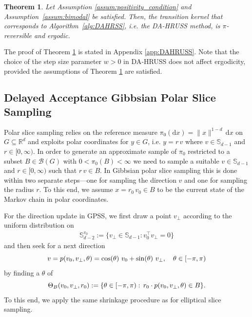 \documentclass[sn-mathphys-num]{sn-jnl}%
\theoremstyle{thmstyleone}%
\newtheorem{theorem}{Theorem}%
\theoremstyle{thmstyletwo}%
\theoremstyle{thmstylethree}%
\newcommand{\rhoapp}{\varrho_{{\rm app}}}
\newcommand{\change}[1]{\bgroup\color{black}#1\egroup}    %
\begin{document}
\begin{theorem}\label{theo:DAHRUSS}
\change{Let Assumption \ref{assum:positivity_condition} and Assumption~\ref{assum:bimodal} be satisfied.} Then, the transition kernel that corresponds to Algorithm~\ref{alg:DAHRSS}, i.e. the DA-HRUSS method, is $\pi$-reversible and ergodic.
\end{theorem}
The proof of Theorem \ref{theo:DAHRUSS} is stated in Appendix \ref{app:DAHRUSS}. 
Note that the choice of the step size parameter $w>0$ in DA‑HRUSS does not affect ergodicity, provided the assumptions of Theorem \ref{theo:DAHRUSS} are satisfied. 

\subsection{Delayed Acceptance Gibbsian Polar Slice Sampling}\label{sec:DA-GPSS}

Polar slice sampling relies on the reference measure $\pi_0(\mathrm dx) = \|x\|^{1-d} \, \mathrm dx$ on $G \subseteq \mathbb R^d$ and exploits polar coordinates for $y\in G$, i.e. $y = r\,v$ where $v \in \mathbb{S}_{d-1}$ and $r \in [0, \infty)$. %
In order to generate an approximate sample of $\pi_0$ restricted to a subset $B\in\mathcal B(G)$ with $0 < \pi_0(B) < \infty$ we need to sample a suitable $v \in \mathbb{S}_{d-1}$ and $r \in [0, \infty)$ such that $r\,v \in B$.
In Gibbsian polar slice sampling this is done within two separate steps---one for sampling the direction $v$ and one for sampling the radius $r$. 
To this end, we assume $x = r_0\,v_0 \in B$ to be the current state of the Markov chain in polar coordinates.  

For the direction update in GPSS, we first draw a point $v_{\perp}$ according to the uniform distribution on 
\begin{align*}
   \mathbb{S}^{v_0}_{d-2}:=\{v_{\perp} \in\mathbb{S}_{d-1}: v_0^\top v_{\perp} = 0 \}
\end{align*}
and then seek for a next direction
\[
    v 
    = p(v_0, v_\perp, \theta)
    = \cos(\theta) \ v_0 + \sin(\theta)\ v_\perp, \quad \change{\theta\in[-\pi,\pi)}
\]
by finding a $\theta$ of
\[
   \Theta_B(v_0,v_\perp,r_0):=\{\theta\in\change{[-\pi,\pi)}: \, r_0\cdot p(v_0, v_\perp, \theta)\in B\}.     
\]
To this end, we apply the same shrinkage procedure as for elliptical slice sampling.
\end{document}
